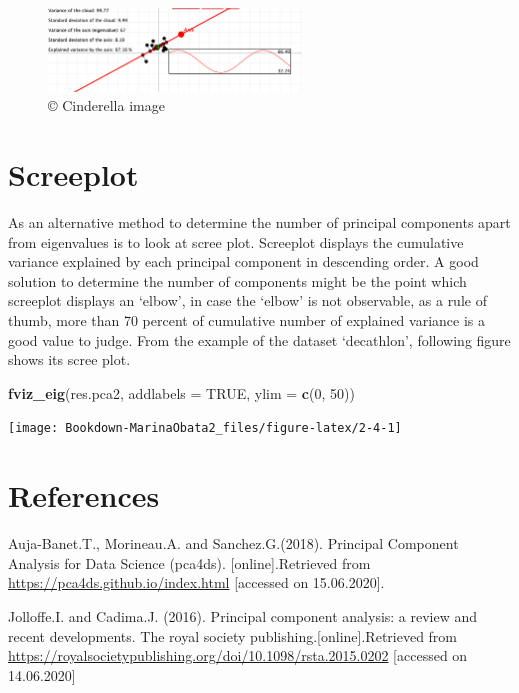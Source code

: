 \documentclass[]{book}
\newenvironment{Shaded}{\begin{snugshade}}{\end{snugshade}}
\newcommand{\DataTypeTok}[1]{\textcolor[rgb]{0.13,0.29,0.53}{#1}}
\newcommand{\DecValTok}[1]{\textcolor[rgb]{0.00,0.00,0.81}{#1}}
\newcommand{\KeywordTok}[1]{\textcolor[rgb]{0.13,0.29,0.53}{\textbf{#1}}}
\newcommand{\NormalTok}[1]{#1}
\newcommand{\OtherTok}[1]{\textcolor[rgb]{0.56,0.35,0.01}{#1}}
\begin{document}
\begin{figure}
\centering
\includegraphics[width=0.6\textwidth,height=\textheight]{Rotation.png}
\caption{© Cinderella image}
\end{figure}

\hypertarget{screeplot}{%
\section{Screeplot}\label{screeplot}}

As an alternative method to determine the number of principal components apart from eigenvalues is to look at scree plot. Screeplot displays the cumulative variance explained by each principal component in descending order. A good solution to determine the number of components might be the point which screeplot displays an `elbow', in case the `elbow' is not observable, as a rule of thumb, more than 70 percent of cumulative number of explained variance is a good value to judge.
From the example of the dataset `decathlon', following figure shows its scree plot.

\begin{Shaded}
\begin{Highlighting}[]
\KeywordTok{fviz_eig}\NormalTok{(res.pca2, }\DataTypeTok{addlabels =} \OtherTok{TRUE}\NormalTok{, }\DataTypeTok{ylim =} \KeywordTok{c}\NormalTok{(}\DecValTok{0}\NormalTok{, }\DecValTok{50}\NormalTok{))}
\end{Highlighting}
\end{Shaded}

\texttt{[image: Bookdown-MarinaObata2\_files/figure-latex/2-4-1]}

\hypertarget{references-1}{%
\section{References}\label{references-1}}

Auja-Banet.T., Morineau.A. and Sanchez.G.(2018). Principal Component Analysis for Data Science (pca4ds). {[}online{]}.Retrieved from \url{https://pca4ds.github.io/index.html} {[}accessed on 15.06.2020{]}.

Jolloffe.I. and Cadima.J. (2016). Principal component analysis: a review and recent developments. The royal society publishing.{[}online{]}.Retrieved from \url{https://royalsocietypublishing.org/doi/10.1098/rsta.2015.0202} {[}accessed on 14.06.2020{]}
\end{document}
